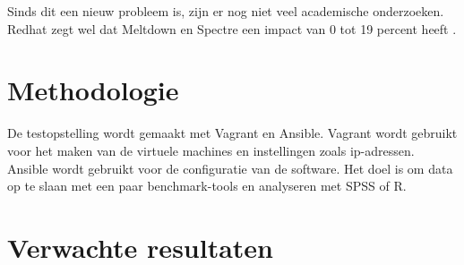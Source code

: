 

Sinds dit een nieuw probleem is, zijn er nog niet veel academische onderzoeken.
Redhat zegt wel dat Meltdown en Spectre een impact van 0 tot 19 percent heeft \autocite{Redhat2018}.
\section{Methodologie}
\label{sec:methodologie}


De testopstelling wordt gemaakt met Vagrant en Ansible. Vagrant wordt gebruikt voor het maken van de virtuele machines en instellingen zoals ip-adressen. Ansible wordt gebruikt voor de configuratie van de software. Het doel is om data op te slaan met een paar benchmark-tools en analyseren met SPSS of R.

\section{Verwachte resultaten}
\label{sec:verwachte_resultaten}


